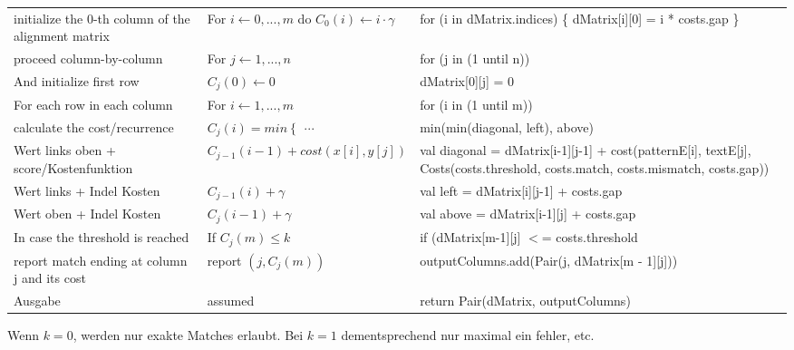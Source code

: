 \begin{erg}
\begin{mytable}
\begin{tabular}{|p{5cm}|p{5cm}|p{5cm}|}
            initialize the 0-th column of the alignment matrix & For $i \gets 0, ..., m$ do $C_0 (i) \gets i \cdot \gamma$
            & for (i in dMatrix.indices) \{ dMatrix[i][0] = i * costs.gap \}
            \\
            proceed column-by-column         & For $j \gets 1,...,n$    & for (j in (1 until n))                                           \\
            And initialize first row         & $C_j(0) \gets 0$         & dMatrix[0][j] = 0                                                \\
            For each row in each column      & For $i \gets 1,...,m$    & for (i in (1 until m))                                           \\
            \hline \hline
            calculate the cost/recurrence & $C_j (i) = min \begin{cases}
                                                               ...
            \end{cases}$ & min(min(diagonal, left), above) \\
            Wert links oben + score/Kostenfunktion & $C_{j-1}(i-1) + cost(x[i], y[j])$ & val diagonal = dMatrix[i-1][j-1] + cost(patternE[i], textE[j],
            Costs(costs.threshold, costs.match, costs.mismatch, costs.gap)) \\
            Wert links + Indel Kosten        & $C_{j-1}(i) + \gamma $   & val left = dMatrix[i][j-1] + costs.gap                           \\
            Wert oben + Indel Kosten         & $C_j (i-1) + \gamma$     & val above = dMatrix[i-1][j] + costs.gap                          \\
            \hline \hline
            In case the threshold is reached & If $C_j(m) \leq k$       & if (dMatrix[m-1][j] $<$= costs.threshold                         \\
            report match ending at column j and its cost & report $(j, C_j (m))$ &
            outputColumns.add(Pair(j, dMatrix[m - 1][j])) \\ \hline \hline
            Ausgabe                          & assumed                  & return Pair(dMatrix, outputColumns)                              \\ \hline
        \end{tabular}
    \end{mytable}
\end{erg}

\begin{kom}
    \color{linkf}
    Wenn $k=0$, werden nur exakte Matches erlaubt.
    Bei $k=1$ dementsprechend nur maximal ein fehler, etc.
\end{kom}


